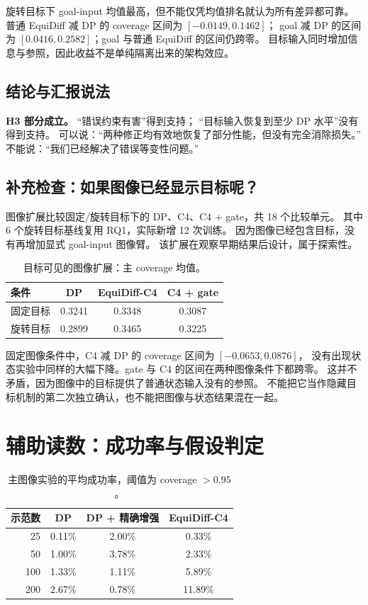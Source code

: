 旋转目标下 goal-input 均值最高，但不能仅凭均值排名就认为所有差异都可靠。
普通 EquiDiff 减 DP 的 coverage 区间为 $[-0.0149,0.1462]$；
goal 减 DP 的区间为 $[0.0416,0.2582]$；goal 与普通 EquiDiff 的区间仍跨零。
目标输入同时增加信息与参照，因此收益不是单纯隔离出来的架构效应。

\subsection{结论与汇报说法}
\textbf{H3 部分成立。} ``错误约束有害''得到支持；
``目标输入恢复到至少 DP 水平''没有得到支持。
可以说：``两种修正均有效地恢复了部分性能，但没有完全消除损失。''
不能说：``我们已经解决了错误等变性问题。''

\subsection{补充检查：如果图像已经显示目标呢？}
图像扩展比较固定/旋转目标下的 DP、C4、C4 + gate，共 18 个比较单元。
其中 6 个旋转目标基线复用 RQ1，实际新增 12 次训练。
因为图像已经包含目标，没有再增加显式 goal-input 图像臂。
该扩展在观察早期结果后设计，属于探索性。

\begin{table}[htbp]
\centering
\caption{目标可见的图像扩展：主 coverage 均值。}
\label{eqstudy:zh:tab:image}
\begin{tabular}{lccc}
\toprule
条件 & DP & EquiDiff-C4 & C4 + gate \\
\midrule
固定目标 & 0.3241 & 0.3348 & 0.3087 \\
旋转目标 & 0.2899 & 0.3465 & 0.3225 \\
\bottomrule
\end{tabular}
\end{table}

固定图像条件中，C4 减 DP 的 coverage 区间为 $[-0.0653,0.0876]$，
没有出现状态实验中同样的大幅下降。gate 与 C4 的区间在两种图像条件下都跨零。
这并不矛盾，因为图像中的目标提供了普通状态输入没有的参照。
不能把它当作隐藏目标机制的第二次独立确认，也不能把图像与状态结果混在一起。

\section{辅助读数：成功率与假设判定}
\label{eqstudy:zh:conclusions}
\begin{table}[htbp]
\centering
\caption{主图像实验的平均成功率，阈值为 coverage $>0.95$。}
\label{eqstudy:zh:tab:success}
\begin{tabular}{rccc}
\toprule
示范数 & DP & DP + 精确增强 & EquiDiff-C4 \\
\midrule
25 & 0.11\% & 2.00\% & 0.33\% \\
50 & 1.00\% & 3.78\% & 2.33\% \\
100 & 1.33\% & 1.11\% & 5.89\% \\
200 & 2.67\% & 0.78\% & 11.89\% \\
\bottomrule
\end{tabular}
\end{table}

